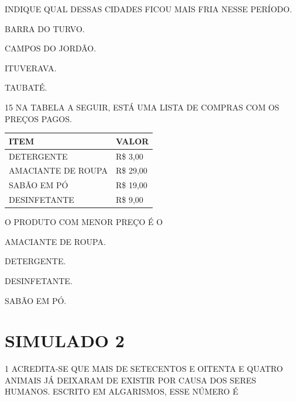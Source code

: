 INDIQUE QUAL DESSAS CIDADES FICOU MAIS FRIA NESSE PERÍODO.

\begin{escolha}
\item BARRA DO TURVO.

\item CAMPOS DO JORDÃO.

\item ITUVERAVA.

\item TAUBATÉ.
\end{escolha}


\num{15} NA TABELA A SEGUIR, ESTÁ UMA LISTA DE COMPRAS COM OS PREÇOS PAGOS.

\begin{longtable}[]{@{}ll@{}}
\toprule
ITEM & VALOR\tabularnewline
\midrule
\endhead
DETERGENTE & R\$ 3,00\tabularnewline
AMACIANTE DE ROUPA & R\$ 29,00\tabularnewline
SABÃO EM PÓ & R\$ 19,00\tabularnewline
DESINFETANTE & R\$ 9,00\tabularnewline
\bottomrule
\end{longtable}

O PRODUTO COM MENOR PREÇO É O

\begin{escolha}
\item AMACIANTE DE ROUPA.

\item DETERGENTE.

\item DESINFETANTE.

\item SABÃO EM PÓ.
\end{escolha}


\chapter{SIMULADO 2}

\num{1} ACREDITA-SE QUE MAIS DE SETECENTOS E OITENTA E QUATRO ANIMAIS JÁ
DEIXARAM DE EXISTIR POR CAUSA DOS SERES HUMANOS. ESCRITO EM ALGARISMOS, ESSE NÚMERO É

